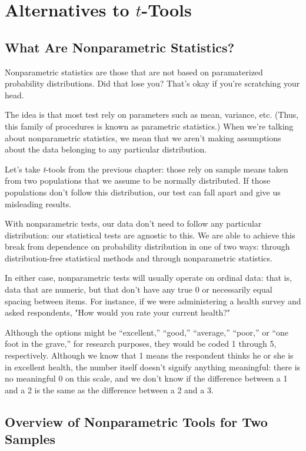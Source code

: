 
\chapter{Alternatives to $t$-Tools}

\section{What Are Nonparametric Statistics?}

Nonparametric statistics are those that are not based on paramaterized probability distributions. Did that lose you? That's okay if you're scratching your head.

The idea is that most test rely on parameters such as mean, variance, etc. (Thus, this family of procedures is known as parametric statistics.) When we're talking about nonparametric statistics, we mean that we aren't making assumptions about the data belonging to any particular distribution.

Let's take \textit{t}-tools from the previous chapter: those rely on sample means taken from two populations that we assume to be normally distributed. If those populations don't follow this distribution, our test can fall apart and give us misleading results.

With nonparametric tests, our data don't need to follow any particular distribution: our statistical tests are agnostic to this. We are able to achieve this break from dependence on probability distribution in one of two ways: through distribution-free statistical methods and through nonparametric statistics.

In either case, nonparametric tests will usually operate on ordinal data: that is, data that are numeric, but that don't have any true 0 or necessarily equal spacing between items. For instance, if we were administering a health survey and asked respondents, "How would you rate your current health?"

Although the options might be ``excellent,'' ``good,'' ``average,'' ``poor,'' or ``one foot in the grave,'' for research purposes, they would be coded 1 through 5, respectively. Although we know that 1 means the respondent thinks he or she is in excellent health, the number itself doesn't signify anything meaningful: there is no meaningful 0 on this scale, and we don't know if the difference between a 1 and a 2 is the same as the difference between a 2 and a 3.

\section{Overview of Nonparametric Tools for Two Samples}

